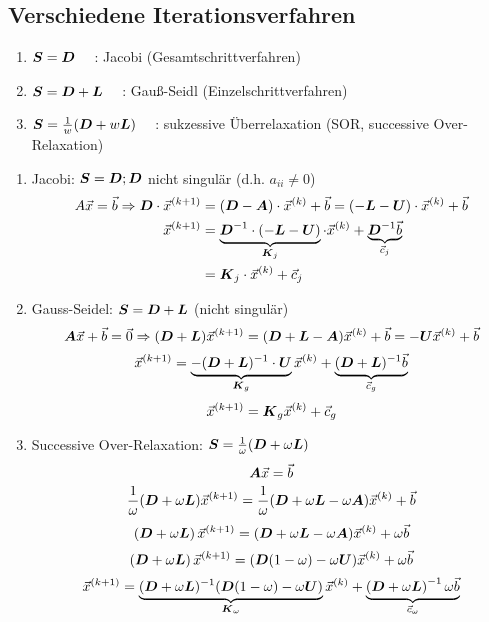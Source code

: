 \subsection{Verschiedene Iterationsverfahren}
\begin{enumerate}
	\item $\boldsymbol {S} = \boldsymbol {D}\quad$ : Jacobi (Gesamtschrittverfahren)
	\item $\boldsymbol {S} = \boldsymbol {D}+\boldsymbol {L}\quad$ : Gauß-Seidl (Einzelschrittverfahren)
	\item $\boldsymbol {S} = \frac{1}{w}(\boldsymbol {D}+w\boldsymbol {L})\quad$ : sukzessive Überrelaxation (SOR, successive Over-Relaxation)
\end{enumerate}
\begin{enumerate}
	\item Jacobi: $\boldsymbol {S} = \boldsymbol {D};\boldsymbol {D}$ nicht singulär (d.h. $a_{ii}\neq 0$)
	\begin{align}
		{A}\vec{x} = \vec{b}\Rightarrow\boldsymbol {D}\cdot\vec{x}^{(k+1)} &= (\boldsymbol {D}-\boldsymbol {A})\cdot\vec{x}^{(k)}+\vec{b} = (-\boldsymbol {L}-\boldsymbol {U})\cdot\vec{x}^{(k)}+\vec{b}\\
		\vec{x}^{(k+1)} &= \underbrace{\boldsymbol {D}^{-1}\cdot(-\boldsymbol {L}-\boldsymbol {U})}_{\boldsymbol {K}_j}\cdot\vec{x}^{(k)}+\underbrace{\boldsymbol {D}^{-1}\vec{b}}_{\vec{c}_j}\\
		&= \boldsymbol {K}_j\cdot\vec{x}^{(k)}+\vec{c}_j
	\end{align}
	\item Gauss-Seidel: $\boldsymbol {S} = \boldsymbol {D} + \boldsymbol {L}$ (nicht singulär)
	\[\boldsymbol {A} \vec{x} + \vec{b} = \vec{0} \Rightarrow (\boldsymbol {D} + \boldsymbol {L}) \vec{x}^{(k + 1)} = (\boldsymbol {D} + \boldsymbol {L} - \boldsymbol {A}) \vec{x}^{(k)} + \vec{b} = -\boldsymbol {U} \vec{x}^{(k)} + \vec{b}\]
	\[\vec{x}^{(k + 1)} = \underbrace{-(\boldsymbol {D} + \boldsymbol {L})^{-1} \cdot \boldsymbol {U}}_{\boldsymbol {K}_g} \vec{x}^{(k)} + \underbrace{(\boldsymbol {D} + \boldsymbol {L})^{-1} \vec{b}}_{\vec{c}_g}\]
	\[\vec{x}^{(k + 1)} = \boldsymbol {K}_g \vec{x}^{(k)} + \vec{c}_g\]
	\item Successive Over-Relaxation: $\boldsymbol {S} = \frac{1}{\omega} (\boldsymbol {D} + \omega \boldsymbol {L})$
	\[\boldsymbol {A} \vec{x} = \vec{b}\]
	\[\frac{1}{\omega} (\boldsymbol {D} + \omega \boldsymbol {L}) \vec{x}^{(k + 1)} = \frac{1}{\omega} (\boldsymbol {D} + \omega \boldsymbol {L} - \omega \boldsymbol {A}) \vec{x}^{(k)} + \vec{b}\]
	\[\left( \boldsymbol {D} + \omega \boldsymbol {L} \right) \vec{x}^{(k + 1)} = (\boldsymbol {D} + \omega \boldsymbol {L} - \omega \boldsymbol {A}) \vec{x}^{(k)} + \omega \vec{b}\]
	\[\left( \boldsymbol {D} + \omega \boldsymbol {L} \right) \vec{x}^{(k + 1)} = (\boldsymbol {D}(1 - \omega) - \omega \boldsymbol {U}) \vec{x}^{(k)} + \omega \vec{b}\]
	\[\vec{x}^{(k + 1)} = \underbrace{(\boldsymbol {D} + \omega \boldsymbol {L})^{-1} (\boldsymbol {D} (1 - \omega) - \omega \boldsymbol {U})}_{\boldsymbol {K}_\omega} \vec{x}^{(k)} + \underbrace{\left( \boldsymbol {D} + \omega \boldsymbol {L} \right)^{-1} \omega \vec{b}}_{\vec{c}_\omega}\]

\end{enumerate}

